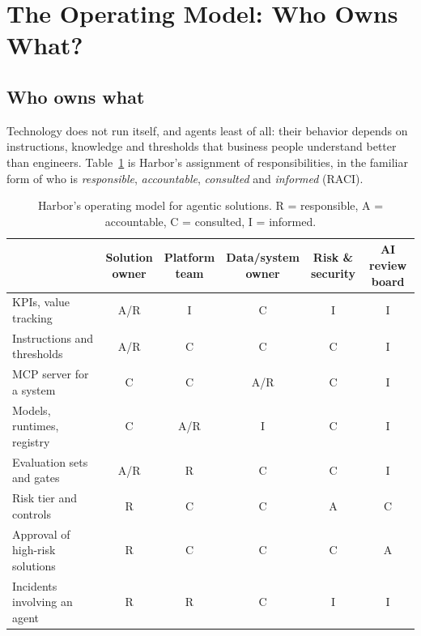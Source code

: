 \section{The Operating Model: Who Owns What?}
\label{sec:cap-operating}

\subsection{Who owns what}

Technology does not run itself, and agents least of all: their behavior depends on instructions, knowledge and thresholds that business people understand better than engineers. Table~\ref{tab:cap-raci} is Harbor's assignment of responsibilities, in the familiar form of who is \emph{responsible}, \emph{accountable}, \emph{consulted} and \emph{informed} (RACI).

\begin{table}[htbp]
\centering
\small
\caption{Harbor's operating model for agentic solutions. R = responsible, A = accountable, C = consulted, I = informed.}
\label{tab:cap-raci}
\begin{tabular}{@{}lccccc@{}}
\toprule
\rowcolor{coHead} & \shortstack{Solution\\owner} & \shortstack{Platform\\team} & \shortstack{Data/system\\owner} & \shortstack{Risk \&\\security} & \shortstack{AI review\\board} \\
\midrule
KPIs, value tracking & A/R & I & C & I & I \\
Instructions and thresholds & A/R & C & C & C & I \\
MCP server for a system & C & C & A/R & C & I \\
Models, runtimes, registry & C & A/R & I & C & I \\
Evaluation sets and gates & A/R & R & C & C & I \\
Risk tier and controls & R & C & C & A & C \\
Approval of high-risk solutions & R & C & C & C & A \\
Incidents involving an agent & R & R & C & I & I \\
\bottomrule
\end{tabular}
\end{table}

